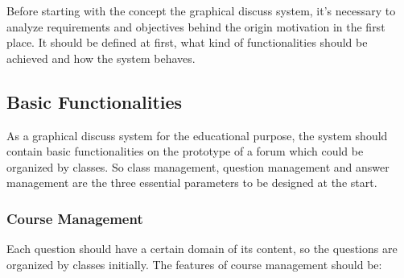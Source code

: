Before starting with the concept the graphical discuss system, it's necessary to analyze requirements and objectives behind the origin motivation in the first place. It should be defined at first, what kind of functionalities should be achieved and how the system behaves.

\subsection{Basic Functionalities}

As a graphical discuss system for the educational purpose, the system should contain basic functionalities on the prototype  of a forum which could be organized by classes. So class management, question management and answer management are the three essential parameters to be designed at the start.

\subsubsection{Course Management}

Each question should have a certain domain of its content, so the questions are organized by classes initially. The features of course management should be:

